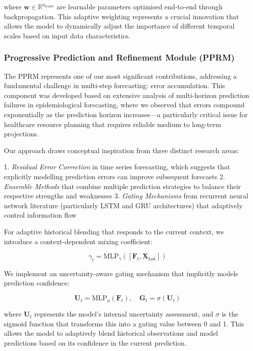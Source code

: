 \documentclass[lettersize, journal]{IEEEtran}
\begin{document}
where $\mathbf{w} \in \mathbb{R}^{n_{\text{scales}}}$ are learnable parameters optimised end-to-end through backpropagation. This adaptive weighting represents a crucial innovation that allows the model to dynamically adjust the importance of different temporal scales based on input data characteristics.

\subsubsection{Progressive Prediction and Refinement Module (PPRM)}
The PPRM represents one of our most significant contributions, addressing a fundamental challenge in multi-step forecasting: error accumulation. This component was developed based on extensive analysis of multi-horizon prediction failures in epidemiological forecasting, where we observed that errors compound exponentially as the prediction horizon increases—a particularly critical issue for healthcare resource planning that requires reliable medium to long-term projections.

Our approach draws conceptual inspiration from three distinct research areas:

1. \textit{Residual Error Correction} in time series forecasting, which suggests that explicitly modelling prediction errors can improve subsequent forecasts
2. \textit{Ensemble Methods} that combine multiple prediction strategies to balance their respective strengths and weaknesses
3. \textit{Gating Mechanisms} from recurrent neural network literature (particularly LSTM and GRU architectures) that adaptively control information flow

For adaptive historical blending that responds to the current context, we introduce a context-dependent mixing coefficient:

\begin{equation}
\gamma_t = \text{MLP}_{\gamma}([\mathbf{F}_t, \mathbf{X}_{\text{last}}])
\end{equation}

We implement an uncertainty-aware gating mechanism that implicitly models prediction confidence:

\begin{equation}
\mathbf{U}_t = \text{MLP}_u(\mathbf{F}_t), \quad \mathbf{G}_t = \sigma(\mathbf{U}_t)
\end{equation}

where $\mathbf{U}_t$ represents the model's internal uncertainty assessment, and $\sigma$ is the sigmoid function that transforms this into a gating value between 0 and 1. This allows the model to adaptively blend historical observations and model predictions based on its confidence in the current prediction.
\end{document}
